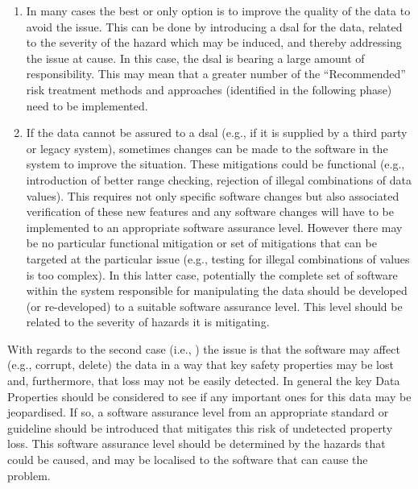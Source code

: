 \begin{enumerate}
  \item {} In many cases the best or only option is to improve the quality of the data to avoid the issue. This can be done by introducing a \gls{dsal} for the data, related to the severity of the hazard which may be induced, and thereby addressing the issue at cause. In this case, the \gls{dsal} is bearing a large amount of responsibility. This may mean that a greater number of the ``Recommended'' risk treatment methods and approaches (identified in the following phase) need to be implemented.
  \item {} If the data cannot be assured to a \gls{dsal} (e.g., if it is supplied by a third party or legacy system), sometimes changes can be made to the software in the system to improve the situation. These mitigations could be functional (e.g., introduction of better range checking, rejection of illegal combinations of data values). This requires not only specific software changes but also associated verification of these new features and any software changes will have to be implemented to an appropriate \gls{software assurance level}. However there may be no particular functional mitigation or set of mitigations that can be targeted at the particular issue (e.g., testing for illegal combinations of values is too complex). In this latter case, potentially the complete set of software within the system responsible for manipulating the data should be developed (or re-developed) to a suitable \gls{software assurance level}. This level should be related to the severity of hazards it is mitigating.
\end{enumerate}

With regards to the second case (i.e., ) the issue is that the software may affect (e.g., corrupt, delete) the data in a way that key safety properties may be lost and, furthermore, that loss may not be easily detected. In general the key Data Properties should be considered to see if any important ones for this data may be jeopardised. If so, a \gls{software assurance level} from an appropriate standard or guideline should be introduced that mitigates this risk of undetected property loss. This \gls{software assurance level} should be determined by the hazards that could be caused, and may be localised to the software that can cause the problem.

